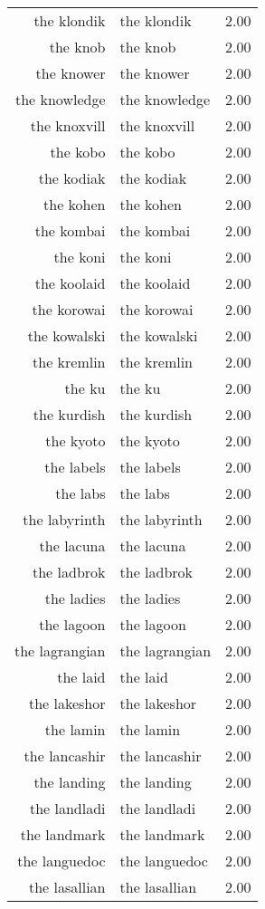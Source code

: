 \begin{table}[ht]
\begin{tabular}{rlr}
  the klondik & the klondik & 2.00 \\ 
  the knob & the knob & 2.00 \\ 
  the knower & the knower & 2.00 \\ 
  the knowledge & the knowledge & 2.00 \\ 
  the knoxvill & the knoxvill & 2.00 \\ 
  the kobo & the kobo & 2.00 \\ 
  the kodiak & the kodiak & 2.00 \\ 
  the kohen & the kohen & 2.00 \\ 
  the kombai & the kombai & 2.00 \\ 
  the koni & the koni & 2.00 \\ 
  the koolaid & the koolaid & 2.00 \\ 
  the korowai & the korowai & 2.00 \\ 
  the kowalski & the kowalski & 2.00 \\ 
  the kremlin & the kremlin & 2.00 \\ 
  the ku & the ku & 2.00 \\ 
  the kurdish & the kurdish & 2.00 \\ 
  the kyoto & the kyoto & 2.00 \\ 
  the labels & the labels & 2.00 \\ 
  the labs & the labs & 2.00 \\ 
  the labyrinth & the labyrinth & 2.00 \\ 
  the lacuna & the lacuna & 2.00 \\ 
  the ladbrok & the ladbrok & 2.00 \\ 
  the ladies & the ladies & 2.00 \\ 
  the lagoon & the lagoon & 2.00 \\ 
  the lagrangian & the lagrangian & 2.00 \\ 
  the laid & the laid & 2.00 \\ 
  the lakeshor & the lakeshor & 2.00 \\ 
  the lamin & the lamin & 2.00 \\ 
  the lancashir & the lancashir & 2.00 \\ 
  the landing & the landing & 2.00 \\ 
  the landladi & the landladi & 2.00 \\ 
  the landmark & the landmark & 2.00 \\ 
  the languedoc & the languedoc & 2.00 \\ 
  the lasallian & the lasallian & 2.00 \\ 

\end{tabular}
\end{table}
